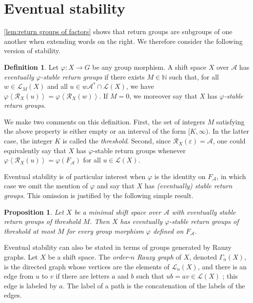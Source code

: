 \documentclass{amsart}
\newcommand*{\nn}{\mathbb{N}}
\newcommand*{\ret}{\mathcal{R}}
\newcommand*{\lang}{\mathcal{L}}
\newcommand*{\cA}{\mathcal{A}}
\newcommand*{\from}{\colon}
\newcommand*{\emptyw}{\varepsilon}
\newcommand*{\RauzyGraph}{\Gamma}
\newcommand*{\gen}[1]{\left\langle #1\right\rangle}
\theoremstyle{plain}
\newtheorem{proposition}[theorem]{Proposition}
\theoremstyle{definition}
\newtheorem{definition}[theorem]{Definition}
\theoremstyle{remark}
\begin{document}
\section{Eventual stability}\label{S:stability and fullness}

\cref{lem:return groups of factors} shows that return groups are subgroups of one another when extending words on the right. We therefore consider the following version of stability.

\begin{definition}\label{D:stable}
    Let $\varphi\from X\to G$ be any group morphism. A shift space $X$ over $\cA$ has \emph{eventually $\varphi$-stable return groups} if there exists $M \in\nn$ such that, for all $w \in \lang_M(X)$ and all $u \in w\cA^* \cap \lang(X)$, we have $\varphi\gen{\ret_X(u)} = \varphi\gen{\ret_X(w)}$. If $M = 0$, we moreover say that $X$ has \emph{$\varphi$-stable return groups}. 
\end{definition}

We make two comments on this definition. First, the set of integers $M$ satisfying the above property is either empty or an interval of the form $[K,\infty)$. In the latter case, the integer $K$ is called the \emph{threshold}. Second, since $\ret_X(\emptyw) = \cA$, one could equivalently say that $X$ has $\varphi$-stable return groups whenever $\varphi\gen{\ret_X(u)} = \varphi(F_\cA)$ for all $u \in \lang(X)$.

Eventual stability is of particular interest when $\varphi$ is the identity on $F_\cA$, in which case we omit the mention of $\varphi$ and say that $X$ has \emph{(eventually) stable return groups}. This omission is justified by the following simple result.

\begin{proposition}\label{P:free group universal}
    Let $X$ be a minimal shift space over $\cA$ with eventually stable return groups of threshold $M$. Then $X$ has eventually $\varphi$-stable return groups of threshold at most $M$ for every group morphism $\varphi$ defined on $F_\cA$.
\end{proposition}

Eventual stability can also be stated in terms of groups generated by Rauzy graphs. Let $X$ be a shift space. 
The \emph{order-$n$ Rauzy graph} of $X$, denoted $\RauzyGraph_n(X)$, is the directed graph whose vertices are the elements of $\lang_n(X)$, and there is an edge from $u$ to $v$ if there are letters $a$ and $b$ such that $ub = av \in \lang(X)$ ; this edge is labeled by $a$. The label of a path is the concatenation of the labels of the edges.
\end{document}
